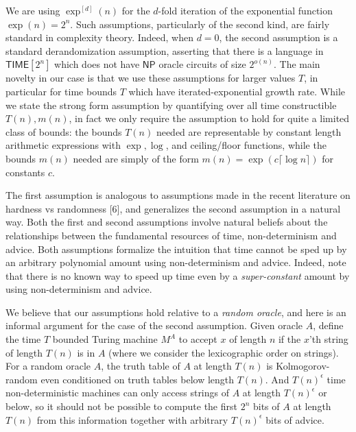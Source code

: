 \documentclass[10pt,a4paper]{article}
\begin{document}
We are using $\exp^{[d]}(n)$ for the $d$-fold iteration of the exponential function $\exp(n)=2^{n}$. Such assumptions, particularly of the second kind, are fairly standard in complexity theory. Indeed, when $d=0$, the second assumption is a standard derandomization assumption, asserting that there is a language in ${\mathsf{TIME}}[2^{n}]$ which does not have ${\mathsf{NP}}$ oracle circuits of size $2^{o(n)}$. The main novelty in our case is that we use these assumptions for larger values $T$, in particular for time bounds $T$ which have iterated-exponential growth rate. While we state the strong form assumption by quantifying over all time constructible $T(n),m(n)$, in fact we only require the assumption to hold for quite a limited class of bounds: the bounds $T(n)$ needed are representable by constant length arithmetic expressions with $\exp,\log$, and ceiling/floor functions, while the bounds $m(n)$ needed are simply of the form $m(n)=\exp(c\lceil\log n\rceil)$ for constants $c$.\par




The first assumption is analogous to assumptions made in the recent literature on hardness vs randomness [6], and generalizes the second assumption in a natural way. Both the first and second assumptions involve natural beliefs about the relationships between the fundamental resources of time, non-determinism and advice. Both assumptions formalize the intuition that time cannot be sped up by an arbitrary polynomial amount using non-determinism and advice. Indeed, note that there is no known way to speed up time even by a \emph{super-constant} amount by using non-determinism and advice.\par




We believe that our assumptions hold relative to a \emph{random oracle}, and here is an informal argument for the case of the second assumption. Given oracle $A$, define the time $T$ bounded Turing machine $M^{A}$ to accept $x$ of length $n$ if the $x$’th string of length $T(n)$ is in $A$ (where we consider the lexicographic order on strings). For a random oracle $A$, the truth table of $A$ at length $T(n)$ is Kolmogorov-random even conditioned on truth tables below length $T(n)$. And $T(n)^{\epsilon}$ time non-deterministic machines can only access strings of $A$ at length $T(n)^{\epsilon}$ or below, so it should not be possible to compute the first $2^{n}$ bits of $A$ at length $T(n)$ from this information together with arbitrary $T(n)^{\epsilon}$ bits of advice.\par
\end{document}
